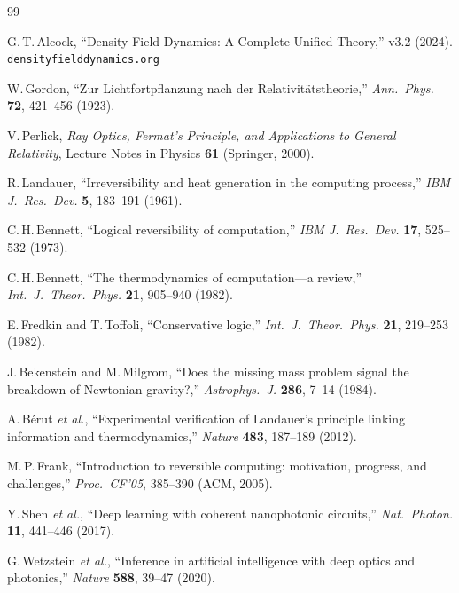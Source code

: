 \documentclass[12pt,a4paper,twoside]{article}
\begin{document}
\begin{thebibliography}{99}

G.\,T.\,Alcock, ``Density Field Dynamics: A Complete Unified Theory,'' v3.2 (2024). \texttt{densityfielddynamics.org}

W.\,Gordon, ``Zur Lichtfortpflanzung nach der Relativit\"atstheorie,'' \emph{Ann.\ Phys.} \textbf{72}, 421--456 (1923).

V.\,Perlick, \emph{Ray Optics, Fermat's Principle, and Applications to General Relativity}, Lecture Notes in Physics \textbf{61} (Springer, 2000).

R.\,Landauer, ``Irreversibility and heat generation in the computing process,'' \emph{IBM J.\ Res.\ Dev.} \textbf{5}, 183--191 (1961).

C.\,H.\,Bennett, ``Logical reversibility of computation,'' \emph{IBM J.\ Res.\ Dev.} \textbf{17}, 525--532 (1973).

C.\,H.\,Bennett, ``The thermodynamics of computation---a review,'' \emph{Int.\ J.\ Theor.\ Phys.} \textbf{21}, 905--940 (1982).

E.\,Fredkin and T.\,Toffoli, ``Conservative logic,'' \emph{Int.\ J.\ Theor.\ Phys.} \textbf{21}, 219--253 (1982).

J.\,Bekenstein and M.\,Milgrom, ``Does the missing mass problem signal the breakdown of Newtonian gravity?,'' \emph{Astrophys.\ J.} \textbf{286}, 7--14 (1984).

A.\,B\'erut \emph{et al.}, ``Experimental verification of Landauer's principle linking information and thermodynamics,'' \emph{Nature} \textbf{483}, 187--189 (2012).

M.\,P.\,Frank, ``Introduction to reversible computing: motivation, progress, and challenges,'' \emph{Proc.\ CF'05}, 385--390 (ACM, 2005).

Y.\,Shen \emph{et al.}, ``Deep learning with coherent nanophotonic circuits,'' \emph{Nat.\ Photon.} \textbf{11}, 441--446 (2017).

G.\,Wetzstein \emph{et al.}, ``Inference in artificial intelligence with deep optics and photonics,'' \emph{Nature} \textbf{588}, 39--47 (2020).


\end{thebibliography}
\end{document}
